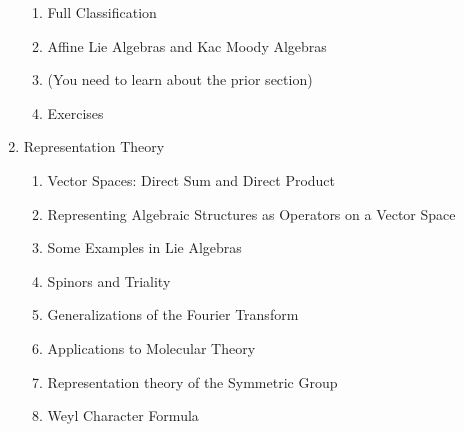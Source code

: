 \documentclass{article}
\begin{document}
\begin{enumerate}
\begin{enumerate}
		\item Full Classification
		\item Affine Lie Algebras and Kac Moody Algebras
		\item (You need to learn about the prior section)
		\item Exercises
	\end{enumerate}
	\item Representation Theory
	\begin{enumerate}
		\item Vector Spaces: Direct Sum and Direct Product
		\item Representing Algebraic Structures as Operators on a Vector Space
		\item Some Examples in Lie Algebras
		\item Spinors and Triality
		\item Generalizations of the Fourier Transform
		\item Applications to Molecular Theory
		\item Representation theory of the Symmetric Group
		\item Weyl Character Formula
	\end{enumerate}
		
	
\end{enumerate}
\end{document}
